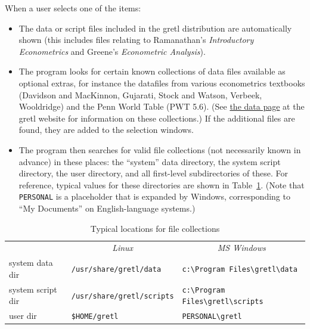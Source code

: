 When a user selects one of the items:

\begin{itemize}
\item The data or script files included in the gretl distribution are
  automatically shown (this includes files relating to Ramanathan's
  \emph{Introductory Econometrics} and Greene's \emph{Econometric
    Analysis}).
\item The program looks for certain known collections of data files
  available as optional extras, for instance the datafiles from
  various econometrics textbooks (Davidson and MacKinnon, Gujarati,
  Stock and Watson, Verbeek, Wooldridge) and the Penn World Table (PWT
  5.6).  (See \href{http://gretl.sourceforge.net/gretl_data.html}{the
    data page} at the gretl website for information on these
  collections.)  If the additional files are found, they are added to
  the selection windows.
\item The program then searches for valid file collections (not
  necessarily known in advance) in these places: the ``system'' data
  directory, the system script directory, the user directory, and all
  first-level subdirectories of these.  For reference, typical values
  for these directories are shown in Table~\ref{tab-colls}.  (Note that
  \texttt{PERSONAL} is a placeholder that is expanded by Windows,
  corresponding to ``My Documents'' on English-language systems.)
\end{itemize}

\begin{table}[htbp]
  \begin{center}
    \begin{tabular}{lll}
      & \multicolumn{1}{c}{\textit{Linux}} & 
      \multicolumn{1}{c}{\textit{MS Windows}} \\
        system data dir & 
        {\small \verb+/usr/share/gretl/data+} &
        {\small \verb+c:\Program Files\gretl\data+} \\
        system script dir & 
        {\small \verb+/usr/share/gretl/scripts+} &
        {\small \verb+c:\Program Files\gretl\scripts+} \\
        user dir & 
        {\small \verb+$HOME/gretl+} &
        {\small \verb+PERSONAL\gretl+}\\
  \end{tabular}
 \end{center}
 \caption{Typical locations for file collections}
 \label{tab-colls}
\end{table}

